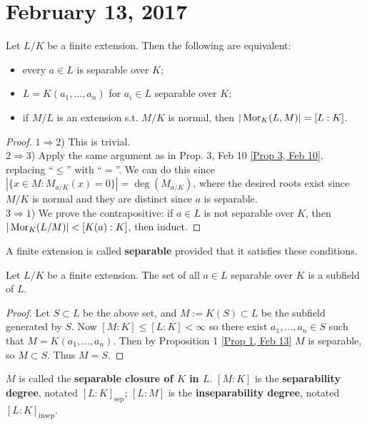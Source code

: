 \section{February 13, 2017}

\begin{prop} \label{Prop 1, Feb 13}
	Let $L/K$ be a finite extension. Then the following are equivalent:
	\begin{itemize}
		\item every $a \in L$ is separable over $K$;
		\item $L = K(a_1, ..., a_n)$ for $a_i \in L$ separable over $K$;
		\item if $M/L$ is an extension s.t. $M/K$ is normal, then $|\operatorname{Mor}_K(L,M)| = [L : K]$.
	\end{itemize}
\end{prop}

\begin{proof}
	$1 \Rightarrow 2$) This is trivial. \\
	$2 \Rightarrow 3$) Apply the same argument as in Prop. 3, Feb 10 \ref{Prop 3, Feb 10}, replacing ``$\leq$'' with ``$=$''. We can do this since $|\{x \in M : M_{a/K}(x) = 0\}| = \deg(M_{a/K})$, where the desired roots exist since $M/K$ is normal and they are distinct since $a$ is separable.\\
	$3 \Rightarrow 1$) We prove the contrapositive: if $a \in L$ is not separable over $K$, then $|\operatorname{Mor}_K(L/M)| < [K(a) : K]$, then induct.
\end{proof}

\begin{defn} \label{Defn 2, Feb 13}
	A finite extension is called \textbf{separable} provided that it satisfies these conditions.
\end{defn}

\begin{cor} \label{Cor 3, Feb 13}
	Let $L/K$ be a finite extension. The set of all $a \in L$ separable over $K$ is a subfield of $L$.
\end{cor}

\begin{proof}
	Let $S \subset L$ be the above set, and $M := K(S) \subset L$ be the subfield generated by $S$. Now $[M : K] \leq [L : K] < \infty$ so there exist $a_1, ..., a_n \in S$ such that $M = K(a_1, ..., a_n)$. Then by Proposition 1 \ref{Prop 1, Feb 13} $M$ is separable, so $M \subset S$. Thus $M = S$.
\end{proof}

\begin{defn} \label{Defn 4, Feb 13}
	$M$ is called the \textbf{separable closure of $K$ in $L$}. $[M : K]$ is the \textbf{separability degree}, notated $[L : K]_{\text{sep}}$; $[L : M]$ is the \textbf{inseparability degree}, notated $[L : K]_{\text{insep}}$.
\end{defn}

